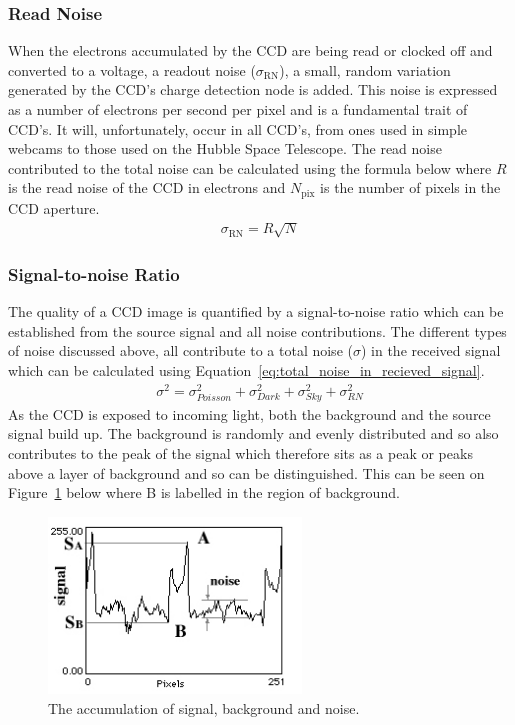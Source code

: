 		\subsubsection{Read Noise} %
		\label{ssub:read_noise}
			When the electrons accumulated by the CCD are being read or clocked off and converted to a voltage, a readout noise ($\sigma_\text{RN}$), a small, random variation generated by the CCD's charge detection node is added. This noise is expressed as a number of electrons per second per pixel and is a fundamental trait of CCD's. It will, unfortunately, occur in all CCD's, from ones used in simple webcams to those used on the Hubble Space Telescope\cite{Understanding_CCD_Read_Noise}. The read noise contributed to the total noise can be calculated using the formula below where $R$ is the read noise of the CCD in electrons and $N_\text{pix}$ is the number of pixels in the CCD aperture.
			\begin{align}
				\sigma_\text{RN} = R\sqrt{N}
			\end{align}

		\subsubsection{Signal-to-noise Ratio} %
		\label{ssub:signal_to_noise_ratio}
			The quality of a CCD image is quantified by a signal-to-noise ratio which can be established from the source signal and all noise contributions. The different types of noise discussed above, all contribute to a total noise ($\sigma$) in the received signal which can be calculated using Equation~\ref{eq:total_noise_in_recieved_signal}.
			\begin{align}
				\sigma^{2} = \sigma_{Poisson}^{2} + \sigma_{Dark}^{2} + \sigma_{Sky}^{2} + \sigma_{RN}^{2} \label{eq:total_noise_in_recieved_signal}
			\end{align}
			As the CCD is exposed to incoming light, both the background and the source signal build up. The background is randomly and evenly distributed and so also contributes to the peak of the signal which therefore sits as a peak or peaks above a layer of background and so can be distinguished. This can be seen on Figure~\ref{fig:signal_noise_accumulation} below where B is labelled in the region of background\cite{Signal_to_Noise_Ratio}.
			\begin{figure}[htbp]
				\centering
				\includegraphics[width=0.6\textwidth]{../Images/SNR.png}
				\caption{The accumulation of signal, background and noise.\label{fig:signal_noise_accumulation}}
			\end{figure}

